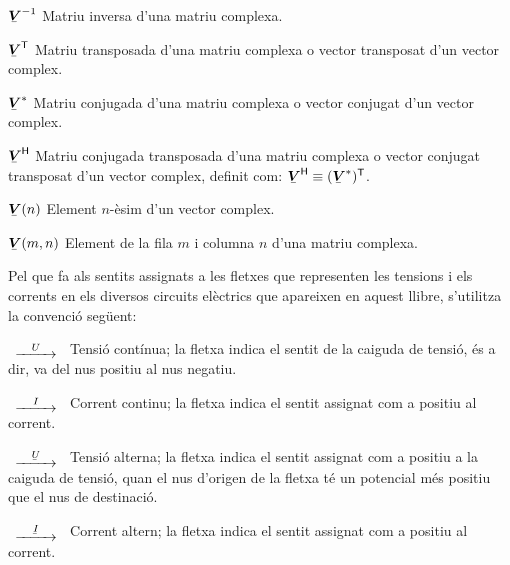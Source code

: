 \begin{list}{}
    \item[$\mcmplx{V}^{-1}$] Matriu inversa d'una matriu complexa.
    \item[$\transp{\mcmplx{V}}$] Matriu transposada d'una matriu complexa o vector
    transposat d'un vector complex.
    \item[$\mcmplx{V}^*$] Matriu conjugada d'una matriu complexa o vector
    conjugat d'un vector complex.
    \item[$\hermit{V}$] Matriu conjugada transposada d'una matriu complexa o vector
    conjugat transposat d'un vector complex, definit com: $\hermit{V} \equiv
    \transp{(\mcmplx{V}^*)}$.
    \item[$\mcmplx{V}(n)$] Element $n$-èsim d'un vector complex.
    \item[$\mcmplx{V}(m,n)$] Element de la fila $m$ i columna $n$ d'una matriu complexa.
\end{list}

Pel que fa als sentits assignats a les fletxes que representen les
tensions i els corrents en els diversos circuits elèctrics que
apareixen en aquest llibre, s'utilitza la convenció següent:

\begin{list}{}
{\setlength{\labelwidth}{15mm} \setlength{\leftmargin}{20mm}
\setlength{\labelsep}{5mm}}
    \item[$\begin{CD} @>U>> \end{CD}$] Tensió contínua; la fletxa indica el sentit
    de la caiguda de tensió, és a dir, va del nus positiu al nus negatiu.
    \item[$\begin{CD} @>I>> \end{CD}$] Corrent
    continu; la fletxa indica el sentit  assignat com a positiu al corrent.
    \item[$\begin{CD} @>\cmplx{U}>> \end{CD}$] Tensió alterna; la fletxa indica el
    sentit assignat com a positiu a la caiguda de tensió, quan el nus d'origen de la fletxa
    té un potencial  més positiu que el nus de destinació.
    \item[$\begin{CD} @>\cmplx{I}>> \end{CD}$] Corrent altern; la fletxa
    indica el sentit  assignat com a positiu al corrent.
\end{list}

\pagebreak

